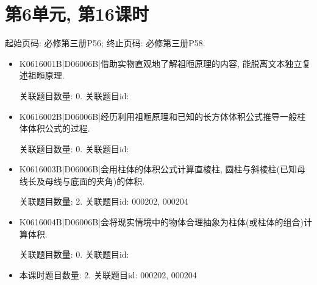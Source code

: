 \section*{第6单元, 第16课时}
起始页码: 必修第三册P56; 终止页码: 必修第三册P58.
\begin{itemize}
\item K0616001B|D06006B|借助实物直观地了解祖暅原理的内容, 能脱离文本独立复述祖暅原理.

关联题目数量: 0. 关联题目id: 

\item K0616002B|D06006B|经历利用祖暅原理和已知的长方体体积公式推导一般柱体体积公式的过程.

关联题目数量: 0. 关联题目id: 

\item K0616003B|D06006B|会用柱体的体积公式计算直棱柱, 圆柱与斜棱柱(已知母线长及母线与底面的夹角)的体积.

关联题目数量: 2. 关联题目id: 000202, 000204

\item K0616004B|D06006B|会将现实情境中的物体合理抽象为柱体(或柱体的组合)计算体积.

关联题目数量: 0. 关联题目id: 

\item 本课时题目数量: 2. 关联题目id: 000202, 000204

\end{itemize}

